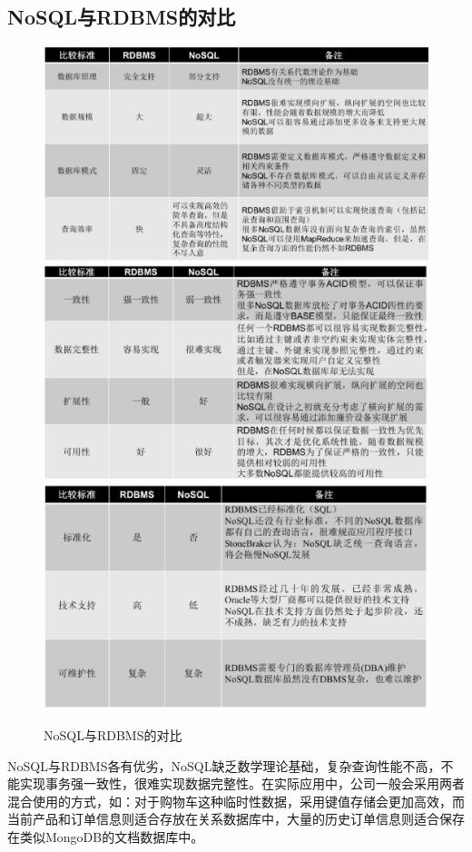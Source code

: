 \documentclass{article}
\begin{document}
\begin{large}
  \subsection{NoSQL与RDBMS的对比}
  \begin{figure}[htbp]
    \centering
    \caption{NoSQL与RDBMS的对比}
    \includegraphics[scale=0.5]{0.eps}
    \includegraphics[scale=0.5]{1.eps}
    \includegraphics[scale=0.5]{2.eps}
  \end{figure}
  NoSQL与RDBMS各有优劣，NoSQL缺乏数学理论基础，复杂查询性能不高，不能实现事务强一致性，很难实现数据完整性。在实际应用中，公司一般会采用两者混合使用的方式，如：对于购物车这种临时性数据，采用键值存储会更加高效，而当前产品和订单信息则适合存放在关系数据库中，大量的历史订单信息则适合保存在类似MongoDB的文档数据库中。


\end{large}
\end{document}
